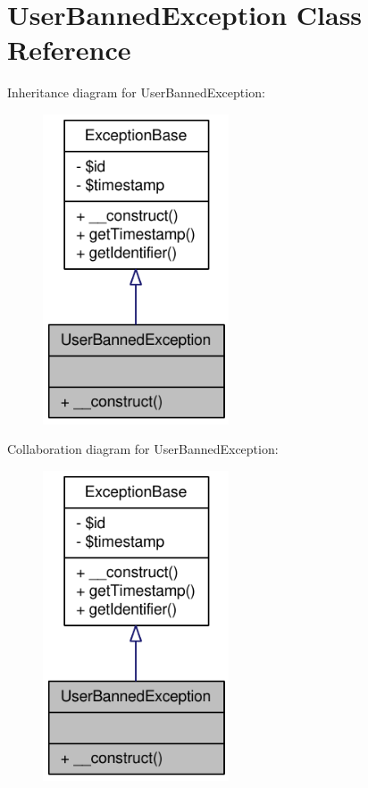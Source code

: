 \hypertarget{classUserBannedException}{
\section{UserBannedException Class Reference}
\label{classUserBannedException}
}


Inheritance diagram for UserBannedException:\nopagebreak
\begin{figure}[H]
\begin{center}
\leavevmode
\includegraphics[width=156pt]{classUserBannedException__inherit__graph}
\end{center}
\end{figure}


Collaboration diagram for UserBannedException:\nopagebreak
\begin{figure}[H]
\begin{center}
\leavevmode
\includegraphics[width=156pt]{classUserBannedException__coll__graph}
\end{center}
\end{figure}
